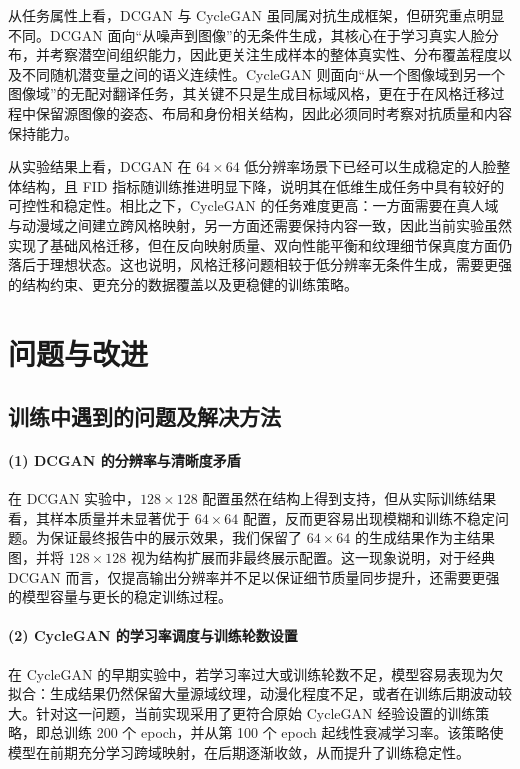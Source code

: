 \documentclass[12pt, a4paper, UTF8]{ctexart}
\begin{document}
从任务属性上看，DCGAN 与 CycleGAN 虽同属对抗生成框架，但研究重点明显不同。DCGAN 面向“从噪声到图像”的无条件生成，其核心在于学习真实人脸分布，并考察潜空间组织能力，因此更关注生成样本的整体真实性、分布覆盖程度以及不同随机潜变量之间的语义连续性。CycleGAN 则面向“从一个图像域到另一个图像域”的无配对翻译任务，其关键不只是生成目标域风格，更在于在风格迁移过程中保留源图像的姿态、布局和身份相关结构，因此必须同时考察对抗质量和内容保持能力。

从实验结果上看，DCGAN 在 $64\times64$ 低分辨率场景下已经可以生成稳定的人脸整体结构，且 FID 指标随训练推进明显下降，说明其在低维生成任务中具有较好的可控性和稳定性。相比之下，CycleGAN 的任务难度更高：一方面需要在真人域与动漫域之间建立跨风格映射，另一方面还需要保持内容一致，因此当前实验虽然实现了基础风格迁移，但在反向映射质量、双向性能平衡和纹理细节保真度方面仍落后于理想状态。这也说明，风格迁移问题相较于低分辨率无条件生成，需要更强的结构约束、更充分的数据覆盖以及更稳健的训练策略。

\section{问题与改进}
\subsection{训练中遇到的问题及解决方法}
\paragraph{(1) DCGAN 的分辨率与清晰度矛盾}
在 DCGAN 实验中，$128\times128$ 配置虽然在结构上得到支持，但从实际训练结果看，其样本质量并未显著优于 $64\times64$ 配置，反而更容易出现模糊和训练不稳定问题。为保证最终报告中的展示效果，我们保留了 $64\times64$ 的生成结果作为主结果图，并将 $128\times128$ 视为结构扩展而非最终展示配置。这一现象说明，对于经典 DCGAN 而言，仅提高输出分辨率并不足以保证细节质量同步提升，还需要更强的模型容量与更长的稳定训练过程。

\paragraph{(2) CycleGAN 的学习率调度与训练轮数设置}
在 CycleGAN 的早期实验中，若学习率过大或训练轮数不足，模型容易表现为欠拟合：生成结果仍然保留大量源域纹理，动漫化程度不足，或者在训练后期波动较大。针对这一问题，当前实现采用了更符合原始 CycleGAN 经验设置的训练策略，即总训练 200 个 epoch，并从第 100 个 epoch 起线性衰减学习率。该策略使模型在前期充分学习跨域映射，在后期逐渐收敛，从而提升了训练稳定性。
\end{document}
